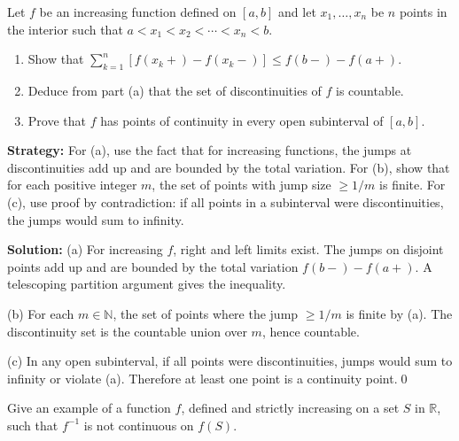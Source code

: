 \begin{problembox}
\begin{problemstatement}
Let $f$ be an increasing function defined on $[a, b]$ and let $x_1, \ldots, x_n$ be $n$ points in the interior such that $a < x_1 < x_2 < \cdots < x_n < b$.
\begin{enumerate}[label=(\alph*)]
\item Show that $\sum_{k=1}^n [f(x_k+) - f(x_k-)] \leq f(b-) - f(a+)$.
\item Deduce from part (a) that the set of discontinuities of $f$ is countable.
\item Prove that $f$ has points of continuity in every open subinterval of $[a, b]$.
\end{enumerate}
\end{problemstatement}
\end{problembox}

\noindent\textbf{Strategy:} For (a), use the fact that for increasing functions, the jumps at discontinuities add up and are bounded by the total variation. For (b), show that for each positive integer $m$, the set of points with jump size $\geq 1/m$ is finite. For (c), use proof by contradiction: if all points in a subinterval were discontinuities, the jumps would sum to infinity.

\bigskip\noindent\textbf{Solution:}
(a) For increasing $f$, right and left limits exist. The jumps on disjoint points add up and are bounded by the total variation $f(b-)-f(a+)$. A telescoping partition argument gives the inequality.

(b) For each $m\in\mathbb{N}$, the set of points where the jump $\ge 1/m$ is finite by (a). The discontinuity set is the countable union over $m$, hence countable.

(c) In any open subinterval, if all points were discontinuities, jumps would sum to infinity or violate (a). Therefore at least one point is a continuity point.\qed



\begin{problembox}
\begin{problemstatement}
Give an example of a function $f$, defined and strictly increasing on a set $S$ in $\mathbb{R}$, such that $f^{-1}$ is not continuous on $f(S)$.
\end{problemstatement}
\end{problembox}

